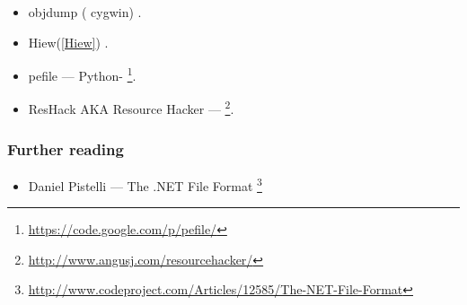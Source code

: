\begin{itemize}
\item
{}
objdump ( cygwin) .

\item
{}
Hiew(\ref{Hiew}) .

\item
pefile --- Python-
\footnote{\url{https://code.google.com/p/pefile/}}.

\item
\label{ResHack}
ResHack \acs{AKA} Resource Hacker --- 
\footnote{\url{http://www.angusj.com/resourcehacker/}}.
\end{itemize}

\subsubsection{Further reading}

\begin{itemize}
\item
Daniel Pistelli --- The .NET File Format \footnote{\url{http://www.codeproject.com/Articles/12585/The-NET-File-Format}}
\end{itemize}

